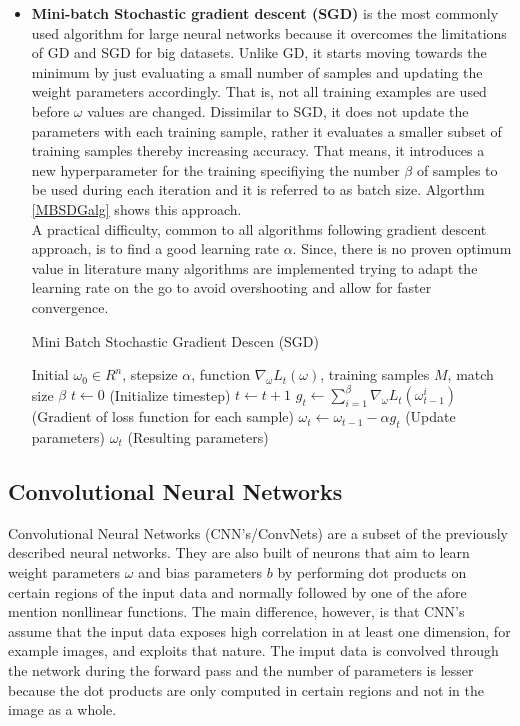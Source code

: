 \begin{itemize}
\item \textbf{Mini-batch Stochastic gradient descent (SGD)} is the most commonly used algorithm for large neural networks because it overcomes the limitations of GD and SGD for big datasets. Unlike GD, it starts moving towards the minimum by just evaluating a small number of samples and updating the weight parameters accordingly. That is, not all training examples are used before $\omega$ values are changed. Dissimilar to SGD, it does not update the parameters with each training sample, rather it evaluates a smaller subset of training samples thereby increasing accuracy. That means, it introduces a new hyperparameter for the training specifiying the number $\beta$ of samples to be used during each iteration and it is referred to as batch size. Algorthm \ref{MBSDGalg} shows this approach. \\
A practical difficulty, common to all algorithms following gradient descent approach, is to find a good learning rate $\alpha$. Since, there is no proven optimum value in literature many algorithms are implemented trying to adapt the learning rate on the go to avoid overshooting and allow for faster convergence.   

\begin{algorithm}
\caption{Mini Batch Stochastic Gradient Descen (SGD)}
\label{MBSDGalg}
\begin{algorithmic}[1]
    \Require Initial $ \omega_0 \in R^n $, stepsize $\alpha  $, function $\nabla_{\omega} L_t ( \omega )$, training samples $M$, match size $\beta$
    \State $t \leftarrow 0$ (Initialize timestep)
    \State $t \leftarrow t+1$
    \State $ g_t \leftarrow \sum_{i=1}^{\beta} \nabla_{\omega} L_t ( \omega_{t-1}^{i} )$ (Gradient of loss function for each sample) 
    \State $\omega_t \leftarrow \omega_{t-1} - \alpha g_t $ (Update parameters)
        \EndFor
    \EndWhile
    \State \Return $\omega_t $ (Resulting parameters)   
\end{algorithmic}
\end{algorithm}     

\end{itemize} 

\FloatBarrier

\subsection{Convolutional Neural Networks}
Convolutional Neural Networks (CNN's/ConvNets) are a subset of the previously described neural networks. They are also built of neurons that aim to learn weight parameters $\omega$ and bias parameters $b$ by performing dot products on certain regions of the input data and normally followed by one of the afore mention nonllinear functions. The main difference, however, is that CNN's assume that the input data exposes high correlation in at least one dimension, for example images, and exploits that nature. The imput data is convolved through the network during the forward pass and the number of parameters is lesser because the dot products are only computed in certain regions and not in the image as a whole.   


